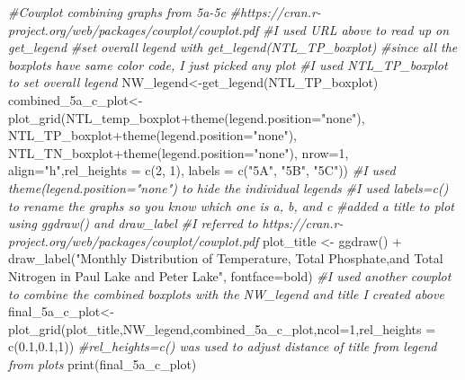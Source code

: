 \documentclass[
]{article}
\newenvironment{Shaded}{\begin{snugshade}}{\end{snugshade}}
\newcommand{\AttributeTok}[1]{\textcolor[rgb]{0.77,0.63,0.00}{#1}}
\newcommand{\CommentTok}[1]{\textcolor[rgb]{0.56,0.35,0.01}{\textit{#1}}}
\newcommand{\DecValTok}[1]{\textcolor[rgb]{0.00,0.00,0.81}{#1}}
\newcommand{\FloatTok}[1]{\textcolor[rgb]{0.00,0.00,0.81}{#1}}
\newcommand{\FunctionTok}[1]{\textcolor[rgb]{0.00,0.00,0.00}{#1}}
\newcommand{\NormalTok}[1]{#1}
\newcommand{\OtherTok}[1]{\textcolor[rgb]{0.56,0.35,0.01}{#1}}
\newcommand{\SpecialCharTok}[1]{\textcolor[rgb]{0.00,0.00,0.00}{#1}}
\newcommand{\StringTok}[1]{\textcolor[rgb]{0.31,0.60,0.02}{#1}}
\begin{document}
\begin{Shaded}
\begin{Highlighting}[]
\CommentTok{\#Cowplot combining graphs from 5a{-}5c}
\CommentTok{\#https://cran.r{-}project.org/web/packages/cowplot/cowplot.pdf}
\CommentTok{\#I used URL above to read up on get\_legend}
\CommentTok{\#set overall legend with get\_legend(NTL\_TP\_boxplot)}
\CommentTok{\#since all the boxplots have same color code, I just picked any plot}
\CommentTok{\#I used NTL\_TP\_boxplot to set overall legend}
\NormalTok{NW\_legend}\OtherTok{\textless{}{-}}\FunctionTok{get\_legend}\NormalTok{(NTL\_TP\_boxplot) }
\NormalTok{combined\_5a\_c\_plot}\OtherTok{\textless{}{-}}\FunctionTok{plot\_grid}\NormalTok{(NTL\_temp\_boxplot}\SpecialCharTok{+}\FunctionTok{theme}\NormalTok{(}\AttributeTok{legend.position=}\StringTok{"none"}\NormalTok{),}
\NormalTok{                    NTL\_TP\_boxplot}\SpecialCharTok{+}\FunctionTok{theme}\NormalTok{(}\AttributeTok{legend.position=}\StringTok{"none"}\NormalTok{), }
\NormalTok{                    NTL\_TN\_boxplot}\SpecialCharTok{+}\FunctionTok{theme}\NormalTok{(}\AttributeTok{legend.position=}\StringTok{"none"}\NormalTok{),}
                    \AttributeTok{nrow=}\DecValTok{1}\NormalTok{, }\AttributeTok{align=}\StringTok{"h"}\NormalTok{,}\AttributeTok{rel\_heights =} \FunctionTok{c}\NormalTok{(}\DecValTok{2}\NormalTok{, }\DecValTok{1}\NormalTok{),}
                    \AttributeTok{labels =} \FunctionTok{c}\NormalTok{(}\StringTok{"5A"}\NormalTok{, }\StringTok{"5B"}\NormalTok{, }\StringTok{"5C"}\NormalTok{))}
\CommentTok{\#I used theme(legend.position="none") to hide the individual legends}
\CommentTok{\#I used labels=c() to rename the graphs so you know which one is a, b, and c}
\CommentTok{\#added a title to plot using ggdraw() and draw\_label}
\CommentTok{\#I referred to https://cran.r{-}project.org/web/packages/cowplot/cowplot.pdf}
\NormalTok{plot\_title }\OtherTok{\textless{}{-}} \FunctionTok{ggdraw}\NormalTok{() }\SpecialCharTok{+} 
\FunctionTok{draw\_label}\NormalTok{(}\StringTok{"Monthly Distribution of Temperature, Total Phosphate,and Total Nitrogen in Paul Lake and Peter Lake"}\NormalTok{, }\AttributeTok{fontface=}\StringTok{\textquotesingle{}bold\textquotesingle{}}\NormalTok{)}
\CommentTok{\#I used another cowplot to combine the combined boxplots with the NW\_legend and title I created above}
\NormalTok{final\_5a\_c\_plot}\OtherTok{\textless{}{-}}\FunctionTok{plot\_grid}\NormalTok{(plot\_title,NW\_legend,combined\_5a\_c\_plot,}\AttributeTok{ncol=}\DecValTok{1}\NormalTok{,}\AttributeTok{rel\_heights =} \FunctionTok{c}\NormalTok{(}\FloatTok{0.1}\NormalTok{,}\FloatTok{0.1}\NormalTok{,}\DecValTok{1}\NormalTok{))}
\CommentTok{\#rel\_heights=c() was used to adjust distance of title from legend from plots}
\FunctionTok{print}\NormalTok{(final\_5a\_c\_plot)}
\end{Highlighting}
\end{Shaded}
\end{document}
